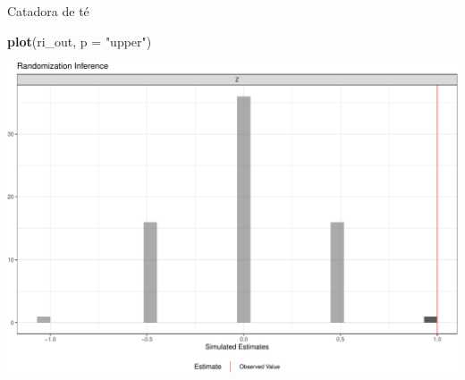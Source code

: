 \documentclass[
  ignorenonframetext,
]{beamer}
\newenvironment{Shaded}{\begin{snugshade}}{\end{snugshade}}
\newcommand{\DataTypeTok}[1]{\textcolor[rgb]{0.13,0.29,0.53}{#1}}
\newcommand{\KeywordTok}[1]{\textcolor[rgb]{0.13,0.29,0.53}{\textbf{#1}}}
\newcommand{\NormalTok}[1]{#1}
\newcommand{\StringTok}[1]{\textcolor[rgb]{0.31,0.60,0.02}{#1}}
\begin{document}
\begin{frame}[fragile]{Catadora de té}
\protect\hypertarget{catadora-de-tuxe9}{}
\begin{Shaded}
\begin{Highlighting}[]
\KeywordTok{plot}\NormalTok{(ri\_out, }\DataTypeTok{p =} \StringTok{"upper"}\NormalTok{)}
\end{Highlighting}
\end{Shaded}

\includegraphics{Aasignacion_aleatoria_simple_files/figure-beamer/plot-1.pdf}
\end{frame}
\end{document}

